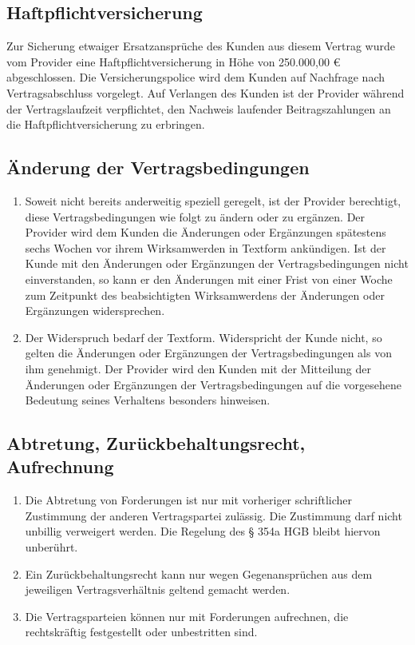 \documentclass{terms}
\begin{document}
\subsection{Haftpflichtversicherung}
Zur Sicherung etwaiger Ersatzansprüche des Kunden aus diesem Vertrag wurde vom Provider eine Haftpflichtversicherung in Höhe von 250.000,00 € abgeschlossen.
Die Versicherungspolice wird dem Kunden auf Nachfrage nach Vertragsabschluss vorgelegt.
Auf Verlangen des Kunden ist der Provider während der Vertragslaufzeit verpflichtet, den Nachweis laufender Beitragszahlungen an die Haftpflichtversicherung zu erbringen.

\subsection{Änderung der Vertragsbedingungen}
\begin{enumerate}
\item Soweit nicht bereits anderweitig speziell geregelt, ist der Provider berechtigt, diese Vertragsbedingungen wie folgt zu ändern oder zu ergänzen.
      Der Provider wird dem Kunden die Änderungen oder Ergänzungen spätestens sechs Wochen vor ihrem Wirksamwerden in Textform ankündigen.
      Ist der Kunde mit den Änderungen oder Ergänzungen der Vertragsbedingungen nicht einverstanden, so kann er den Änderungen mit einer Frist von einer Woche zum Zeitpunkt des beabsichtigten Wirksamwerdens der Änderungen oder Ergänzungen widersprechen.
\item Der Widerspruch bedarf der Textform.
      Widerspricht der Kunde nicht, so gelten die Änderungen oder Ergänzungen der Vertragsbedingungen als von ihm genehmigt.
      Der Provider wird den Kunden mit der Mitteilung der Änderungen oder Ergänzungen der Vertragsbedingungen auf die vorgesehene Bedeutung seines Verhaltens besonders hinweisen.
\end{enumerate}

\subsection{Abtretung, Zurückbehaltungsrecht, Aufrechnung}
\begin{enumerate}
\item Die Abtretung von Forderungen ist nur mit vorheriger schriftlicher Zustimmung der anderen Vertragspartei zulässig.
      Die Zustimmung darf nicht unbillig verweigert werden.
      Die Regelung des § 354a HGB bleibt hiervon unberührt.
\item Ein Zurückbehaltungsrecht kann nur wegen Gegenansprüchen aus dem jeweiligen Vertragsverhältnis geltend gemacht werden.
\item Die Vertragsparteien können nur mit Forderungen aufrechnen, die rechtskräftig festgestellt oder unbestritten sind.
\end{enumerate}
\end{document}
